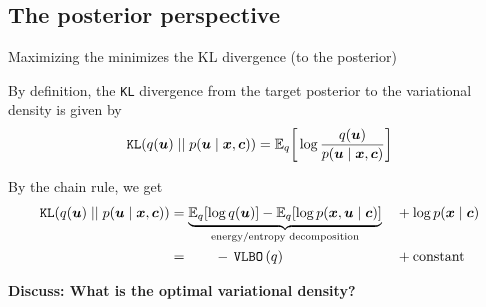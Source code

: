 \documentclass[10pt]{beamer}
\begin{document}
\subsection{The posterior perspective}
\begin{frame}{Maximizing the \VLBO minimizes the KL divergence \tiny (to the posterior)}  


By definition, the \texttt{KL} divergence from the target posterior to the variational density is given by
\begin{equation*}
\texttt{KL} (q(\+u) \; || \; p(\+u \cond \+x, \+c)) =  \E_q \bigg[\log \df{q(\+u )}{p(\+u \cond \+x, \+c)} \bigg] 
\end{equation*}

 


By the chain rule, we get 
\begin{align*} 
 \texttt{KL} (q(\+u) \; || \; p(\+u \cond \+x, \+c)) & = \explaintermbrace{energy/entropy decomposition}{ \E_q[\log q(\+u )]  - \E_q[ \log p(\+x,\+u \cond \+c)]} &&+\log p(\+x \cond \+c) \\
 & = \hphantom{blah} -\VLBO(q)  && +  \text{constant} 
 \end{align*}
 

 
\vfill \tiny \bf{Discuss:} What is the optimal variational density?

\end{frame}
\end{document}
